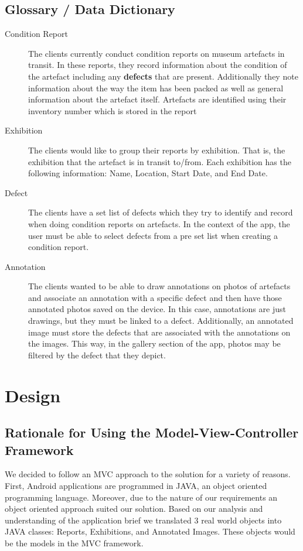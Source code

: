 \documentclass[12pt]{article}
\begin{document}
\subsection{Glossary / Data Dictionary}
\begin{description}
\item [Condition Report] The clients currently conduct condition reports on museum artefacts in transit. In these reports, they record information about the condition of the artefact including any \textbf{defects} that are present. Additionally they note information about the way the item has been packed as well as general information about the artefact itself. Artefacts are identified using their inventory number which is stored in the report

\item [Exhibition] The clients would like to group their reports by exhibition. That is, the exhibition that the artefact is in transit to/from. Each exhibition has the following information: Name, Location, Start Date, and End Date.

\item [Defect] The clients have a set list of defects which they try to identify and record when doing condition reports on artefacts. In the context of the app, the user must be able to select defects from a pre set list when creating a condition report.

\item [Annotation] The clients wanted to be able to draw annotations on photos of artefacts and associate an annotation with a specific defect and then have those annotated photos saved on the device. In this case, annotations are just drawings, but they must be linked to a defect. Additionally, an annotated image must store the defects that are associated with the annotations on the images. This way, in the gallery section of the app, photos may be filtered by the defect that they depict. 
\end{description}
\section{Design}
\subsection{Rationale for Using the Model-View-Controller Framework}
We decided to follow an MVC approach to the solution for a variety of reasons. First, Android applications are programmed in JAVA, an object oriented programming language. Moreover, due to the nature of our requirements an object oriented approach suited our solution. Based on our analysis and understanding of the application brief we translated 3 real world objects into JAVA classes: Reports, Exhibitions, and Annotated Images. These objects would be the models in the MVC framework.\\
\end{document}
